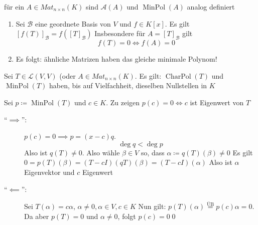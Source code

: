 \begin{subdefinition}
	für ein $ A \in Mat_{n \times n} (K) $ sind $ \mathcal{A} (A) $ und $ \operatorname{Min Pol}(A) $ analog definiert
\end{subdefinition}

\begin{subnote}
	\begin{enumerate}[label=(\arabic*)]
		\item Sei $ \mathcal{B}  $ eine geordnete Basis von $ V $ und $ f \in K[x] $.
			Es gilt $ [f(T)]_{\mathcal{B} } = f\left( [T]_{\mathcal{B} }  \right)  $ 
			Insbesondere für $ A = [T]_{\mathcal{B} }  $ gilt
			\[
				f(T) = 0 \iff f(A) = 0
			\]
		\item Es folgt: ähnliche Matrizen haben das gleiche minimale Polynom!
	\end{enumerate}
\end{subnote}

\begin{subtheorem}
	Sei $ T \in \mathcal{L} (V, V) $ (oder $ A \in Mat_{n \times n} (K) $.
	Es gilt: $ \operatorname{Char Pol}(T)  $ und $ \operatorname{Min Pol}(T) $ haben, bis auf Vielfachheit, dieselben Nullstellen in $ K $
\end{subtheorem}
\begin{subproof*}
	Sei $ p \coloneqq \operatorname{Min Pol}(T) $ und $ c \in K $.
	Zu zeigen $ p(c) = 0 \iff c $ ist Eigenwert von $ T $ 
	\begin{description}
		\item[``$ \implies  $'':] $ p(c) = 0 \implies p = (x - c) q $.
			\[
				\deg q < \deg p
			\]
			Also ist $ q(T) \neq 0 $.
			Also wähle $ \beta \in V $ so, dass $ \alpha \coloneqq  q(T) (\beta) \neq 0 $ 
			Es gilt $ 0 = p(T)(\beta) = (T - cI)(qT)(\beta) = (T - cI)(\alpha) $
			Also ist $ \alpha $ Eigenvektor und $ c $ Eigenwert
		\item[``$ \impliedby  $'':] Sei $ T(\alpha) = c \alpha $, $ \alpha \neq 0, \alpha \in V, c \in K $ 
			Nun gilt: $ p(T)(\alpha) \overset{\text{ÜB} }{=} p(c) \alpha = 0 $.
			Da aber $ p(T) = 0 $ und $ \alpha \neq 0 $, folgt $ p(c) = 0 $\qed
	\end{description}
\end{subproof*}


